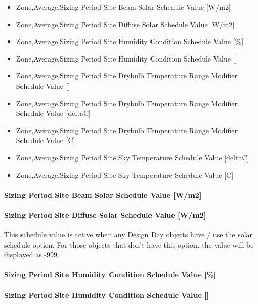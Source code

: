 \begin{itemize}
\item
  Zone,Average,Sizing Period Site Beam Solar Schedule Value {[}W/m2{]}
\item
  Zone,Average,Sizing Period Site Diffuse Solar Schedule Value {[}W/m2{]}
\item
  Zone,Average,Sizing Period Site Humidity Condition Schedule Value {[}\%{]}
\item
  Zone,Average,Sizing Period Site Humidity Condition Schedule Value {[]}
\item
  Zone,Average,Sizing Period Site Drybulb Temperature Range Modifier Schedule Value {[]}
\item
  Zone,Average,Sizing Period Site Drybulb Temperature Range Modifier Schedule Value {[}deltaC{]}
\item
  Zone,Average,Sizing Period Site Drybulb Temperature Range Modifier Schedule Value {[}C{]}
\item
  Zone,Average,Sizing Period Site Sky Temperature Schedule Value {[}deltaC{]}
\item
  Zone,Average,Sizing Period Site Sky Temperature Schedule Value {[}C{]}
\end{itemize}

\paragraph{Sizing Period Site Beam Solar Schedule Value {[}W/m2{]}}\label{sizing-period-site-beam-solar-schedule-value-wm2}

\paragraph{Sizing Period Site Diffuse Solar Schedule Value {[}W/m2{]}}\label{sizing-period-site-diffuse-solar-schedule-value-wm2}

This schedule value is active when any Design Day objects have / use the solar schedule option. For those objects that don't have this option, the value will be displayed as -999.

\paragraph{Sizing Period Site Humidity Condition Schedule Value {[}\%{]}}\label{sizing-period-site-humidity-condition-schedule-value}

\paragraph{Sizing Period Site Humidity Condition Schedule Value {[]}}\label{sizing-period-site-humidity-condition-schedule-value-1}

